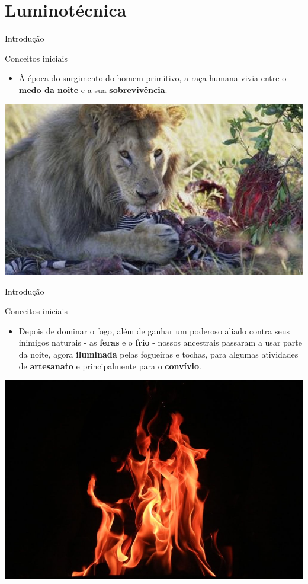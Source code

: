 \section{Luminotécnica}


\begin{frame}{Introdução}
	\begin{block}{Conceitos iniciais}
		\begin{itemize}
			\item À época do surgimento do homem primitivo, a raça humana vivia entre o \textbf{medo da noite} e a sua \textbf{sobrevivência}.
		\end{itemize}
	\end{block}

	\centering
	\includegraphics[width=0.85\linewidth]{Figuras/Ch07/fig1.2}

\end{frame}


\begin{frame}{Introdução}
	\begin{block}{Conceitos iniciais}
		\begin{itemize}
			\item Depois de dominar o fogo, além de ganhar um poderoso aliado contra seus inimigos naturais - as \textbf{feras} e o \textbf{frio} - nossos ancestrais passaram a usar parte da noite, agora \textbf{iluminada} pelas fogueiras e tochas, para algumas atividades de \textbf{artesanato} e principalmente para o \textbf{convívio}.
		\end{itemize}
	\end{block}

	\centering
	\includegraphics[width=0.6\linewidth]{Figuras/Ch07/fig1.1}

\end{frame}


